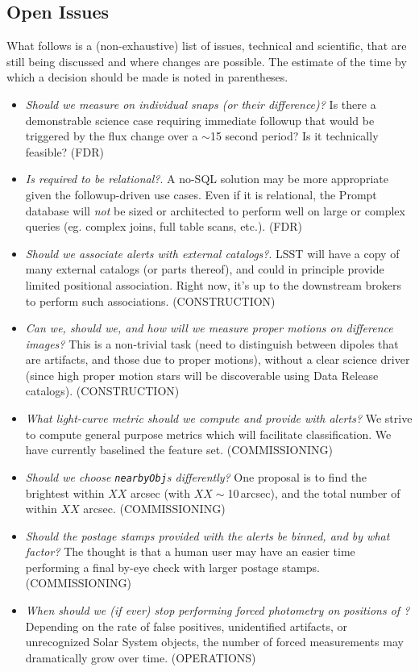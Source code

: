 \documentclass[SE,lsstdraft,toc]{lsstdoc}
\begin{document}
\begin{openissues}
\subsection{Open Issues}

What follows is a (non-exhaustive) list of issues, technical and scientific, that are still being discussed and where changes are possible. The estimate of the time by which a decision should be made is noted in parentheses.

\begin{itemize}
    \item \emph{Should we measure on individual snaps (or their difference)?} Is there a demonstrable science case requiring immediate followup that would be triggered by the flux change over a $\sim$15 second period? Is it technically feasible? (FDR)
    \item \emph{Is \PPDB required to be relational?}. A no-SQL solution may be more appropriate given the followup-driven use cases. Even if it is relational, the Prompt database will \emph{not} be sized or architected to perform well on large or complex queries (eg. complex joins, full table scans, etc.). (FDR)
    \item \emph{Should we associate alerts with external catalogs?}. LSST will have a copy of many external catalogs (or parts thereof), and could in principle provide limited positional association. Right now, it's up to the downstream brokers to perform such associations. (CONSTRUCTION)
    \item \emph{Can we, should we, and how will we measure proper motions on difference images?} This is a non-trivial task (need to distinguish between dipoles that are artifacts, and those due to proper motions), without a clear science driver (since high proper motion stars will be discoverable using Data Release catalogs). (CONSTRUCTION)
    \item \emph{What light-curve metric should we compute and provide with alerts?} We strive to compute general purpose metrics which will facilitate classification. We have currently baselined the \citet{2011ApJ...733...10R} feature set. (COMMISSIONING)
    \item \emph{Should we choose \texttt{nearbyObj}s differently?} One proposal is to find the brightest \Object within $XX$ arcsec (with $XX \sim$10\,arcsec), and the total number of \Objects within $XX$ arcsec. (COMMISSIONING)
    \item \emph{Should the postage stamps provided with the alerts be binned, and by what factor?} The thought is that a human user may have an easier time performing a final by-eye check with larger postage stamps. (COMMISSIONING)
    \item \emph{When should we (if ever) stop performing forced photometry on positions of \DIAObjects?} Depending on the rate of false positives, unidentified artifacts, or unrecognized Solar System objects, the number of forced measurements may dramatically grow over time. (OPERATIONS)

\end{itemize}
\end{openissues}
\end{document}
